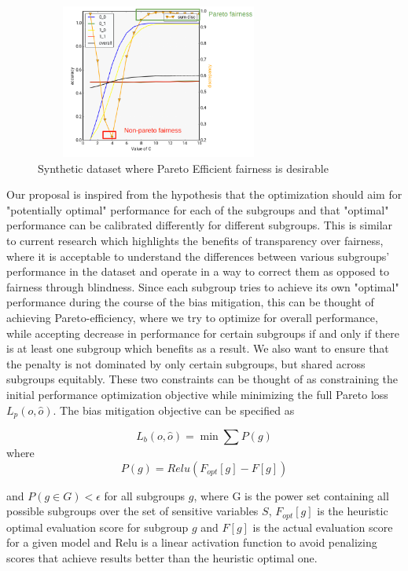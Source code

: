 \begin{figure}[htbp]
	\begin{center}
		\includegraphics[width=3.2in,height=2in]{pareto.png} 
        \setlength{\belowcaptionskip}{-8pt} 
		\caption{Synthetic dataset where Pareto Efficient fairness is desirable}
		\label{pareto}
	\end{center}
\end{figure}

Our proposal is inspired from the hypothesis that the optimization should aim for "potentially optimal" performance for each of the subgroups and that "optimal" performance can be calibrated differently for different subgroups. This is similar to current research which highlights the benefits of transparency over fairness, where it is acceptable to understand the differences between various subgroups' performance in the dataset and operate in a way to correct them as opposed to fairness through blindness. Since each subgroup tries to achieve its own "optimal" performance during the course of the bias mitigation, this can be thought of achieving Pareto-efficiency, where we try to optimize for overall performance, while accepting decrease in performance for certain subgroups if and only if there is at least one subgroup which benefits as a result. We also want to ensure that the penalty is not dominated by only certain subgroups, but shared across subgroups equitably. These two constraints can be thought of as constraining the initial performance optimization objective while
minimizing the full Pareto loss $L_{p}(o, \hat{o})$. The bias mitigation objective can be specified as

\[ L_{b}(o, \hat{o}) =\min \sum{P(g)} \]
where 
\[ P(g) = Relu(F_{opt}[g] - F[g]) \]

and
$P(g \in G) < \epsilon$ for all subgroups $g$,
where G is the power set containing all possible subgroups over the set of sensitive variables $S$, $F_{opt}[g]$ is the heuristic optimal evaluation score for subgroup $g$ and $F[g]$ is the actual evaluation score for a given model and Relu is a linear activation function to avoid penalizing scores that achieve results better than the heuristic optimal one.

